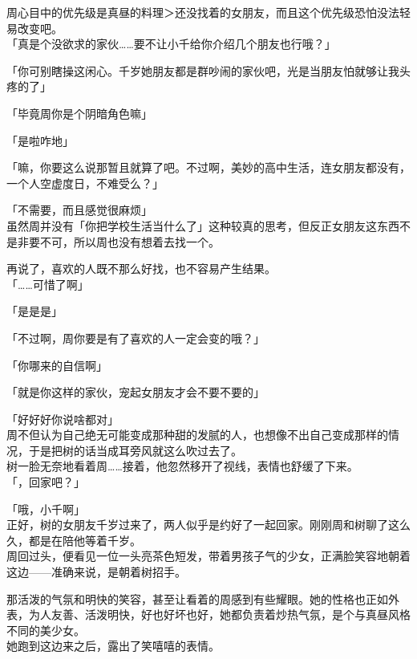 周心目中的优先级是真昼的料理＞还没找着的女朋友，而且这个优先级恐怕没法轻易改变吧。\\

「真是个没欲求的家伙……要不让小千给你介绍几个朋友也行哦？」

「你可别瞎操这闲心。千岁她朋友都是群吵闹的家伙吧，光是当朋友怕就够让我头疼的了」

「毕竟周你是个阴暗角色嘛」

「是啦咋地」

「嘛，你要这么说那暂且就算了吧。不过啊，美妙的高中生活，连女朋友都没有，一个人空虚度日，不难受么？」

「不需要，而且感觉很麻烦」\\

虽然周并没有「你把学校生活当什么了」这种较真的思考，但反正女朋友这东西不是非要不可，所以周也没有想着去找一个。

再说了，喜欢的人既不那么好找，也不容易产生结果。\\

「……可惜了啊」

「是是是」

「不过啊，周你要是有了喜欢的人一定会变的哦？」

「你哪来的自信啊」

「就是你这样的家伙，宠起女朋友才会不要不要的」

「好好好你说啥都对」\\

周不但认为自己绝无可能变成那种甜的发腻的人，也想像不出自己变成那样的情况，于是把树的话当成耳旁风就这么吹过去了。\\

树一脸无奈地看着周……接着，他忽然移开了视线，表情也舒缓了下来。\\

「，回家吧？」

「哦，小千啊」\\

正好，树的女朋友千岁过来了，两人似乎是约好了一起回家。刚刚周和树聊了这么久，都是在陪他等着千岁。\\

周回过头，便看见一位一头亮茶色短发，带着男孩子气的少女，正满脸笑容地朝着这边——准确来说，是朝着树招手。

那活泼的气氛和明快的笑容，甚至让看着的周感到有些耀眼。她的性格也正如外表，为人友善、活泼明快，好也好坏也好，她都负责着炒热气氛，是个与真昼风格不同的美少女。\\

她跑到这边来之后，露出了笑嘻嘻的表情。

